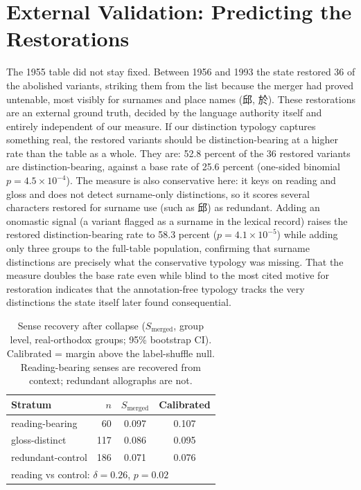 \documentclass[10pt,twocolumn]{article}
\begin{document}
\section{External Validation: Predicting the Restorations}
The 1955 table did not stay fixed. Between 1956 and 1993 the state restored 36 of
the abolished variants, striking them from the list because the merger had proved
untenable, most visibly for surnames and place names (邱, 於). These restorations
are an external ground truth, decided by the language authority itself and
entirely independent of our measure. If our distinction typology captures
something real, the restored variants should be distinction-bearing at a higher
rate than the table as a whole. They are: 52.8 percent of the 36 restored
variants are distinction-bearing, against a base rate of 25.6 percent (one-sided
binomial $p = 4.5\times10^{-4}$). The measure is also conservative here: it
keys on reading and gloss and does not detect surname-only distinctions, so it
scores several characters restored for surname use (such as 邱) as redundant.
Adding an onomastic signal (a variant flagged as a surname in the lexical
record) raises the restored distinction-bearing rate to 58.3 percent ($p =
4.1\times10^{-5}$) while adding only three groups to the full-table population,
confirming that surname distinctions are precisely what the conservative typology
was missing. That the measure doubles the base rate even while blind to the most
cited motive for restoration indicates that the annotation-free typology tracks
the very distinctions the state itself later found consequential.

\begin{table}[t]
\centering\small
\caption{Sense recovery after collapse ($S_{\mathrm{merged}}$, group level,
real-orthodox groups; 95\% bootstrap CI). Calibrated = margin above the
label-shuffle null. Reading-bearing senses are recovered from context; redundant
allographs are not.}
\label{tab:sense}
\begin{tabular}{lrcc}
\toprule
Stratum & $n$ & $S_{\mathrm{merged}}$ & Calibrated \\
\midrule
reading-bearing & 60 & 0.097 & 0.107 \\
gloss-distinct & 117 & 0.086 & 0.095 \\
redundant-control & 186 & 0.071 & 0.076 \\
\midrule
\multicolumn{4}{l}{reading vs control: $\delta=0.26$, $p=0.02$} \\
\bottomrule
\end{tabular}
\end{table}
\end{document}
